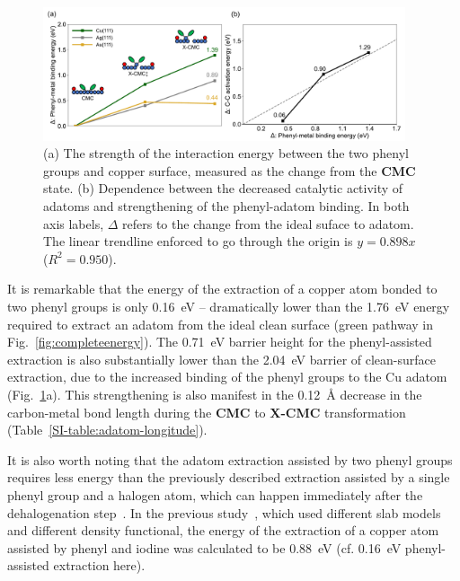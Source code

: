 \documentclass[aps,prb,amsmath,amssymb,11pt]{revtex4-1}
\begin{document}
\begin{figure}[bt]
\centering
\includegraphics[width=0.95\textwidth]{Fig/onlysurface.pdf}
\caption{
(a) The strength of the interaction energy between the two phenyl groups and copper surface, measured as the change from the \textbf{CMC} state. (b) Dependence between the decreased catalytic activity of adatoms and strengthening of the phenyl-adatom binding. In both axis labels, $\Delta$ refers to the change from the ideal suface to adatom. The linear trendline enforced to go through the origin is $y=0.898 x$ ($R^2 = 0.950$).}
\label{fig:onlysurface}
\end{figure}

It is remarkable that the energy of the extraction of a copper atom bonded to two phenyl groups is only \SI{0.16}{\electronvolt} -- dramatically lower than the \SI{1.76}{\electronvolt} energy required to extract an adatom from the ideal clean surface (green pathway in Fig.~\ref{fig:completeenergy}). The \SI{0.71}{\electronvolt} barrier height for the phenyl-assisted extraction is also substantially lower than the \SI{2.04}{\electronvolt} barrier of clean-surface extraction, due to the increased binding of the phenyl groups to the Cu adatom (Fig.~\ref{fig:onlysurface}a). This strengthening is also manifest in the \SI{0.12}{\angstrom} decrease in the carbon-metal bond length during the \textbf{CMC} to \textbf{X-CMC} transformation (Table~\ref{SI-table:adatom-longitude}).

It is also worth noting that the adatom extraction assisted by two phenyl groups requires less energy than the previously described extraction assisted by a single phenyl group and a halogen atom, which can happen immediately after the dehalogenation step~\cite{chemeurope2017}. In the previous study~\cite{chemeurope2017}, which used different slab models and different density functional, the energy of the extraction of a copper atom assisted by phenyl and iodine was calculated to be \SI{0.88}{\electronvolt} (cf. \SI{0.16}{\electronvolt} phenyl-assisted extraction here). 
\end{document}

